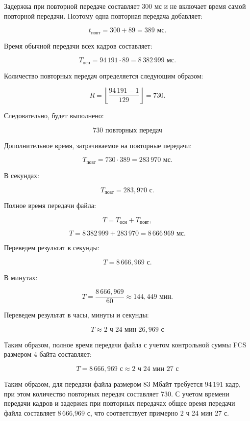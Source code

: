 Задержка при повторной передаче составляет 300 мс и не включает
время самой повторной передачи. Поэтому одна повторная передача
добавляет:

\[
t_{\text{повт}}=300+89=389\text{ мс}.
\]

Время обычной передачи всех кадров составляет:

\[
T_{\text{осн}}
=
94\,191\cdot89
=
8\,382\,999 \text{ мс}.
\]

Количество повторных передач определяется следующим образом:

\[
R=
\left\lfloor
\frac{94\,191-1}{129}
\right\rfloor
=
730.
\]

Следовательно, будет выполнено:

\[
\boxed{730\text{ повторных передач}}
\]

Дополнительное время, затрачиваемое на повторные передачи:

\[
T_{\text{повт}}
=
730\cdot389
=
283\,970\text{ мс}.
\]

В секундах:

\[
T_{\text{повт}}
=
283{,}970\text{ с}.
\]

Полное время передачи файла:

\[
T=
T_{\text{осн}}+T_{\text{повт}},
\]

\[
T=
8\,382\,999+283\,970
=
8\,666\,969\text{ мс}.
\]

Переведем результат в секунды:

\[
T=
8\,666{,}969\text{ с}.
\]

В минутах:

\[
T=
\frac{8\,666{,}969}{60}
\approx144{,}449\text{ мин}.
\]

Переведем результат в часы, минуты и секунды:

\[
\boxed{
T\approx2\text{ ч }24\text{ мин }26{,}969\text{ с}
}
\]

Таким образом, полное время передачи файла с учетом контрольной
суммы FCS размером 4 байта составляет:

\[
\boxed{
T=8\,666{,}969\text{ с}
\approx2\text{ ч }24\text{ мин }27\text{ с}
}
\]

Таким образом, для передачи файла размером 83 Мбайт требуется
94\,191 кадр, при этом количество повторных передач составляет
730. С учетом времени передачи кадров и задержек при повторных
передачах общее время передачи файла составляет
8\,666{,}969 с, что соответствует примерно 2 ч 24 мин 27 с.